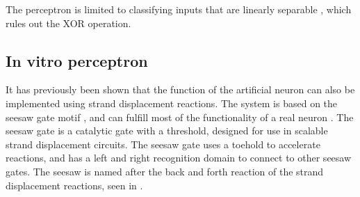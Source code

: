 The perceptron is limited to classifying inputs that are linearly separable \cite{ZhaoYanling}, which rules out the XOR operation.




%
%

\subsection{In vitro perceptron}
It has previously been shown that the function of the artificial neuron can also be implemented using strand displacement reactions. The system is based on the seesaw gate motif \cite{Qian}, and can fulfill most of the functionality of a real neuron \cite{Qian2011}. The seesaw gate is a catalytic gate with a threshold, designed for use in scalable strand displacement circuits. The seesaw gate uses a toehold to accelerate reactions, and has a left and right recognition domain to connect to other seesaw gates. The seesaw is named after the back and forth reaction of the strand displacement reactions, seen in .

